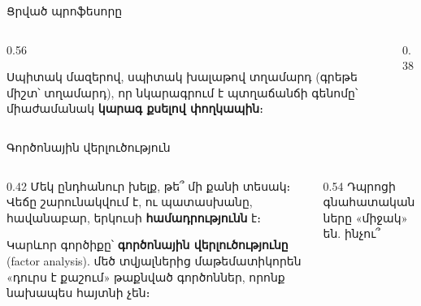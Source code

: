 
\begin{frame}{Ցրված պրոֆեսորը}
  \begin{columns}[T]
    \begin{column}{0.56\textwidth}
      \begin{bookquote}
        Սպիտակ մազերով, սպիտակ խալաթով տղամարդ (գրեթե միշտ՝ տղամարդ), որ նկարագրում է պտղաճանճի գենոմը՝ միաժամանակ \textbf{կարագ քսելով փողկապին}։
      \end{bookquote}
    \end{column}
    \begin{column}{0.38\textwidth}
      \centering
      \ \ \par\medskip
    \end{column}
  \end{columns}
\end{frame}

\begin{frame}{Գործոնային վերլուծություն}
  \begin{columns}[c]
    \begin{column}{0.42\textwidth}
      Մեկ ընդհանուր խելք, թե՞ մի քանի տեսակ։ Վեճը շարունակվում է, ու պատասխանը, հավանաբար, երկուսի \textbf{համադրությունն} է։\par\medskip
      Կարևոր գործիքը՝ \textbf{գործոնային վերլուծությունը} (factor analysis). մեծ տվյալներից մաթեմատիկորեն «դուրս է քաշում» թաքնված գործոններ, որոնք նախապես հայտնի չեն։
    \end{column}
    \begin{column}{0.54\textwidth}
      \centering
      {\blackfont\small Դպրոցի գնահատականները «միջակ» են. ինչու՞}\par\smallskip
    \end{column}
  \end{columns}
\end{frame}

